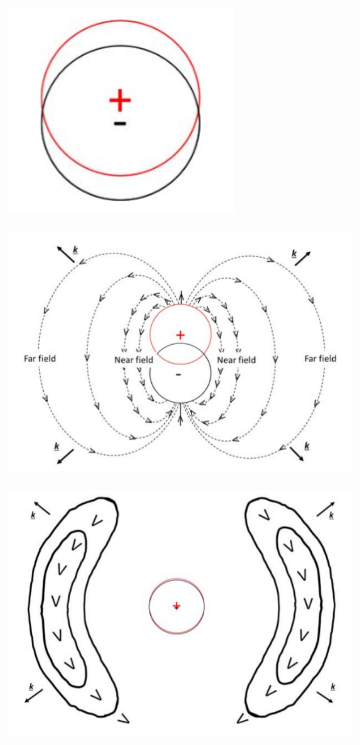 \documentclass[a4paper, 11pt, normalem]{report}
\begin{document}
\begin{figure}[H]
	\centering
	\begin{subfigure}[b]{0.2\textwidth}
		\includegraphics[scale=0.3]{waveprod1.png}
		\caption{}
	\end{subfigure}
	\begin{subfigure}[b]{0.35\textwidth}
		\includegraphics[scale=0.3]{waveprod2.png}
		\caption{}
	\end{subfigure}
	\begin{subfigure}[b]{0.35\textwidth}
		\includegraphics[scale=0.3]{waveprod3.png}
		\caption{}
	\end{subfigure}
\end{figure}
\end{document}
